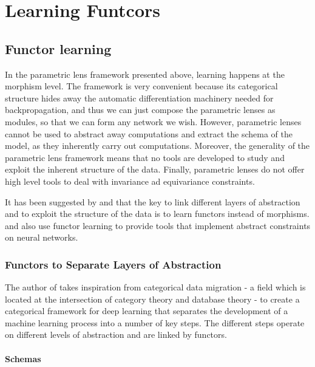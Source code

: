 \documentclass[11pt,a4paper,openright,twoside]{report}
\theoremstyle{plain}
\theoremstyle{definition}
\begin{document}
\chapter{Learning Funtcors}


\lhead[\fancyplain{}{\bfseries\thepage}]{\fancyplain{}{\bfseries\rightmark}}

\section{Functor learning}

In the parametric lens framework presented above, learning happens at the morphism level. The framework is very convenient because its categorical structure hides away the automatic differentiation machinery needed for backpropagation, and thus we can just compose the parametric lenses as modules, so that we can form any network we wish. However, parametric lenses cannot be used to abstract away computations and extract the schema of the model, as they inherently carry out computations. Moreover, the generality of the parametric lens framework means that no tools are developed to study and exploit the inherent structure of the data. Finally, parametric lenses do not offer high level tools to deal with invariance ad equivariance constraints. 

It has been suggested by \cite{gavranovic2019compositional} and \cite{sheshmani2021categorical} that the key to link different layers of abstraction and to exploit the structure of the data is to learn functors instead of morphisms. \cite{gavranovic2019compositional} and \cite{vaswani2017attention} also use functor learning to provide tools that implement abstract constraints on neural networks.



\subsection{Functors to Separate Layers of Abstraction}

The author of \cite{gavranovic2019compositional} takes inspiration from categorical data migration - a field which is located at the intersection of category theory and database theory - to create a categorical framework for deep learning that separates the development of a machine learning process into a number of key steps. The different steps operate on different levels of abstraction and are linked by functors.

\subsubsection{Schemas}
\end{document}
